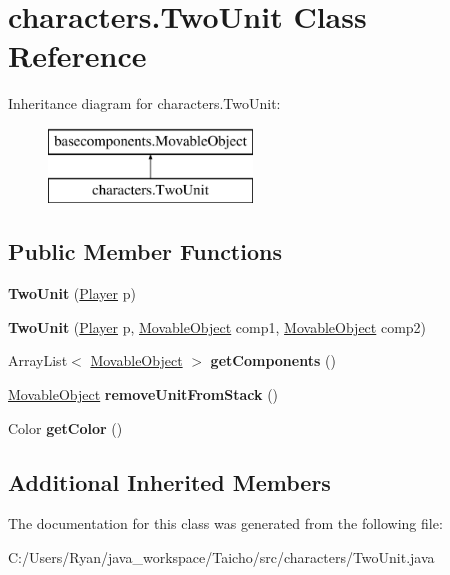 \hypertarget{classcharacters_1_1_two_unit}{\section{characters.\-Two\-Unit Class Reference}
\label{classcharacters_1_1_two_unit}
}
Inheritance diagram for characters.\-Two\-Unit\-:\begin{figure}[H]
\begin{center}
\leavevmode
\includegraphics[height=2.000000cm]{classcharacters_1_1_two_unit}
\end{center}
\end{figure}
\subsection*{Public Member Functions}
\begin{DoxyCompactItemize}
\item 
\hypertarget{classcharacters_1_1_two_unit_ab2dd12ed7fa3a7fbf6daf5a9c9889c7f}{{\bfseries Two\-Unit} (\hyperlink{enumenums_1_1_player}{Player} p)}\label{classcharacters_1_1_two_unit_ab2dd12ed7fa3a7fbf6daf5a9c9889c7f}

\item 
\hypertarget{classcharacters_1_1_two_unit_a30404d5242a7763e2513e4e4b1e47711}{{\bfseries Two\-Unit} (\hyperlink{enumenums_1_1_player}{Player} p, \hyperlink{classbasecomponents_1_1_movable_object}{Movable\-Object} comp1, \hyperlink{classbasecomponents_1_1_movable_object}{Movable\-Object} comp2)}\label{classcharacters_1_1_two_unit_a30404d5242a7763e2513e4e4b1e47711}

\item 
\hypertarget{classcharacters_1_1_two_unit_a77c9ee8e5a6931a0512f8faa36cd8c0d}{Array\-List$<$ \hyperlink{classbasecomponents_1_1_movable_object}{Movable\-Object} $>$ {\bfseries get\-Components} ()}\label{classcharacters_1_1_two_unit_a77c9ee8e5a6931a0512f8faa36cd8c0d}

\item 
\hypertarget{classcharacters_1_1_two_unit_a003ddceef94fa29e16d1f0240a532788}{\hyperlink{classbasecomponents_1_1_movable_object}{Movable\-Object} {\bfseries remove\-Unit\-From\-Stack} ()}\label{classcharacters_1_1_two_unit_a003ddceef94fa29e16d1f0240a532788}

\item 
\hypertarget{classcharacters_1_1_two_unit_aeb0cee86b6cbb3fb7207390347c88262}{Color {\bfseries get\-Color} ()}\label{classcharacters_1_1_two_unit_aeb0cee86b6cbb3fb7207390347c88262}

\end{DoxyCompactItemize}
\subsection*{Additional Inherited Members}


The documentation for this class was generated from the following file\-:\begin{DoxyCompactItemize}
\item 
C\-:/\-Users/\-Ryan/java\-\_\-workspace/\-Taicho/src/characters/Two\-Unit.\-java\end{DoxyCompactItemize}
